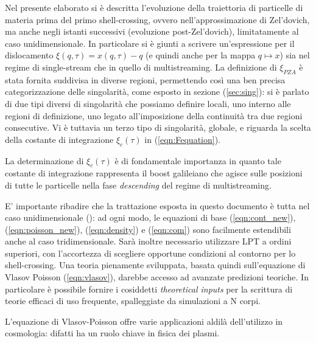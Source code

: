 Nel presente elaborato si è descritta l'evoluzione della traiettoria di 
particelle di materia prima del primo shell-crossing, ovvero nell'approssimazione di
Zel'dovich, ma anche negli istanti successivi (evoluzione post-Zel'dovich), limitatamente al caso unidimensionale. 
In particolare si è giunti a scrivere un'espressione per il dislocamento $\xi(q, \tau) = x(q,\tau)-q$
(e quindi anche per la mappa $q\mapsto x$) sia nel regime di single-stream che in quello di multistreaming.
La definizione di $\xi_{PZA}$ è stata fornita suddivisa in diverse regioni, permettendo così 
una ben precisa categorizzazione delle singolarità, come esposto in sezione (\ref{sec:sing}): si è 
parlato di due tipi diversi di singolarità che possiamo definire locali, uno interno alle 
regioni di definizione, uno legato all'imposizione della continuità tra due regioni consecutive.
Vi è tuttavia un terzo tipo di singolarità, globale, e riguarda la scelta della
costante di integrazione $\xi_c(\tau)$ in (\ref{eqn:Fequation}).

\begin{comment}
    qui non ben chiaro cosa si intende per spatial average, e che tipo di singolarità è la terza
\end{comment}

La determinazione di $\xi_c(\tau)$ è di fondamentale importanza in quanto tale costante 
di integrazione rappresenta il boost galileiano che agisce sulle posizioni di tutte le 
particelle nella fase \textit{descending} del regime di multistreaming.

E' importante ribadire che la trattazione esposta in questo documento
è tutta nel caso unidimensionale (\cite{rampf}): ad ogni modo, le equazioni di base (\ref{eqn:cont_new}),
(\ref{eqn:poisson_new}), (\ref{eqn:density}) e (\ref{eqn:com}) sono facilmente estendibili
anche al caso tridimensionale. Sarà inoltre necessario utilizzare LPT a ordini superiori,
con l'accortezza di scegliere opportune condizioni al contorno per lo shell-crossing.
Una teoria pienamente sviluppata, basata quindi sull'equazione di Vlasov Poisson 
(\ref{eqn:vlasov}), darebbe accesso ad avanzate predizioni teoriche. In particolare è possibile
fornire i cosiddetti \textit{theoretical inputs} per la scrittura di teorie efficaci di uso 
frequente, spalleggiate da simulazioni a N corpi.

L'equazione di Vlasov-Poisson offre varie applicazioni aldilà dell'utilizzo in 
cosmologia: difatti ha un ruolo chiave in fisica dei plasmi.
